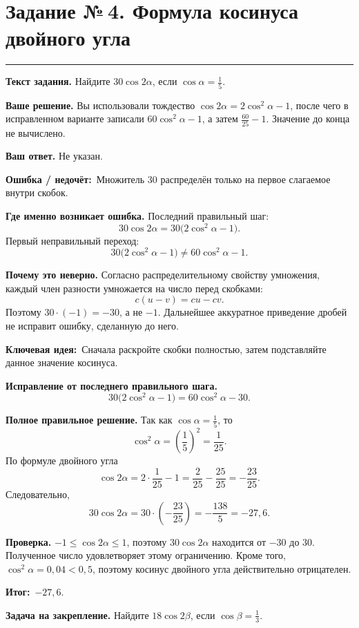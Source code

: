 \documentclass[a4paper,11pt]{article}
\newcommand{\rlabel}[1]{\par\noindent\textbf{\color{darkaccent}#1}\quad}
\newcommand{\errorlabel}{\textcolor{err}{\textbf{Ошибка / недочёт:}}}
\newcommand{\keylabel}{\textcolor{blue!60!black}{\textbf{Ключевая идея:}}}
\newcommand{\finallabel}{\textcolor{teal!60!black}{\textbf{Итог:}}}
\newcommand{\tasktitle}[2]{\clearpage\phantomsection\label{task:#1}\section*{Задание №\,#1. #2}\vspace{-3mm}\textcolor{accent}{\rule{\linewidth}{0.45pt}}}
\begin{document}
\tasktitle{4}{Формула косинуса двойного угла}
\rlabel{Текст задания.} Найдите $30\cos2\alpha$, если $\cos\alpha=\frac15$.
\rlabel{Ваше решение.} Вы использовали тождество $\cos2\alpha=2\cos^2\alpha-1$, после чего в исправленном варианте записали $60\cos^2\alpha-1$, а затем $\frac{60}{25}-1$. Значение до конца не вычислено.
\rlabel{Ваш ответ.} Не указан.
\par\noindent\errorlabel\ Множитель $30$ распределён только на первое слагаемое внутри скобок.
\rlabel{Где именно возникает ошибка.} Последний правильный шаг:
\[
30\cos2\alpha=30\bigl(2\cos^2\alpha-1\bigr).
\]
Первый неправильный переход:
\[
30\bigl(2\cos^2\alpha-1\bigr)\ne60\cos^2\alpha-1.
\]
\rlabel{Почему это неверно.} Согласно распределительному свойству умножения, каждый член разности умножается на число перед скобками:
\[
c(u-v)=cu-cv.
\]
Поэтому $30\cdot(-1)=-30$, а не $-1$. Дальнейшее аккуратное приведение дробей не исправит ошибку, сделанную до него.
\par\noindent\keylabel\ Сначала раскройте скобки полностью, затем подставляйте данное значение косинуса.
\rlabel{Исправление от последнего правильного шага.}
\[
30\bigl(2\cos^2\alpha-1\bigr)=60\cos^2\alpha-30.
\]
\rlabel{Полное правильное решение.} Так как $\cos\alpha=\frac15$, то
\[
\cos^2\alpha=\left(\frac15\right)^2=\frac1{25}.
\]
По формуле двойного угла
\[
\cos2\alpha=2\cdot\frac1{25}-1
=\frac2{25}-\frac{25}{25}=-\frac{23}{25}.
\]
Следовательно,
\[
30\cos2\alpha=30\cdot\left(-\frac{23}{25}\right)
=-\frac{138}{5}=-27{,}6.
\]
\rlabel{Проверка.} $-1\le\cos2\alpha\le1$, поэтому $30\cos2\alpha$ находится от $-30$ до $30$. Полученное число удовлетворяет этому ограничению. Кроме того, $\cos^2\alpha=0{,}04<0{,}5$, поэтому косинус двойного угла действительно отрицателен.
\par\noindent\finallabel\ $\boxed{-27{,}6}$.
\rlabel{Задача на закрепление.} Найдите $18\cos2\beta$, если $\cos\beta=\frac13$.
\end{document}
